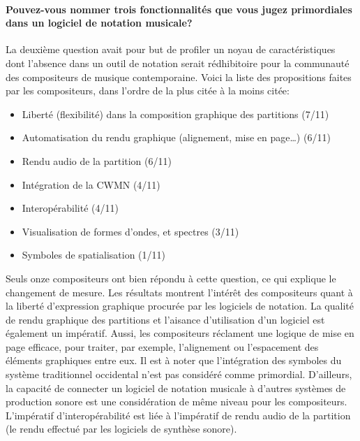 \paragraph{Pouvez-vous nommer trois fonctionnalités que vous jugez primordiales dans un logiciel de notation musicale?} La deuxième question avait pour but de profiler un noyau de caractéristiques dont l'absence dans un outil de notation serait rédhibitoire pour la communauté des compositeurs de musique contemporaine.
Voici la liste des propositions faites par les compositeurs, dans l'ordre de la plus citée à la moins citée:
\begin{itemize}[label=--]
	\item Liberté (flexibilité) dans la composition graphique des partitions (7/11)
	\item Automatisation du rendu graphique (alignement, mise en page…) (6/11)
	\item Rendu audio de la partition (6/11)
	\item Intégration de la CWMN (4/11)
	\item Interopérabilité (4/11)
	\item Visualisation de formes d'ondes, et spectres (3/11)
	\item Symboles de spatialisation (1/11)
\end{itemize}

Seuls onze compositeurs ont bien répondu à cette question, ce qui explique le changement de mesure. Les résultats montrent l'intérêt des compositeurs quant à la liberté d'expression graphique procurée par les logiciels de notation. La qualité de rendu graphique des partitions et l'aisance d'utilisation d'un logiciel est également un impératif. Aussi, les compositeurs réclament une logique de mise en page efficace, pour traiter, par exemple, l'alignement ou l'espacement des éléments graphiques entre eux.
Il est à noter que l'intégration des symboles du système traditionnel occidental n'est pas considéré comme primordial. D'ailleurs, la capacité de connecter un logiciel de notation musicale à d'autres systèmes de production sonore est une considération de même niveau pour les compositeurs. L'impératif d'interopérabilité est liée à l'impératif de rendu audio de la partition (le rendu effectué par les logiciels de synthèse sonore).


